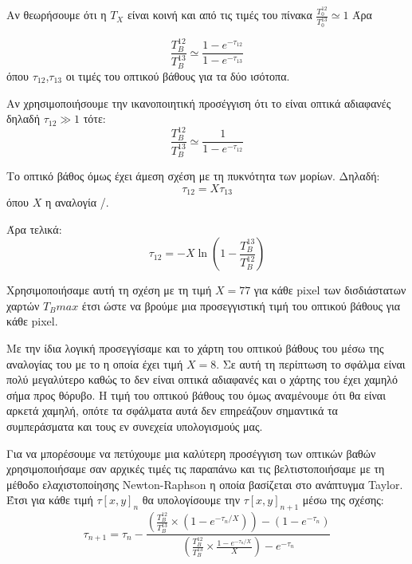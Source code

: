 \documentclass[a4paper,12pt]{memoir}
\begin{document}
Αν θεωρήσουμε ότι η $T_X$ είναι κοινή και από τις τιμές του πίνακα $\frac{T_0 ^{12}}{T_0 ^{13}} \simeq 1$
Άρα

\begin{equation}
\frac{T_B ^{12}}{T_B ^{13}} \simeq \frac{1-e^{-\tau _{12}}}{1-e^{-\tau _{13}}}
\end{equation}
όπου $\tau _{12}$,$\tau _{13}$ οι τιμές του οπτικού βάθους για τα δύο ισότοπα.

Αν χρησιμοποιήσουμε την ικανοποιητική προσέγγιση ότι το  είναι οπτικά αδιαφανές δηλαδή $\tau _{12} \gg 1$ τότε:
\begin{equation}
\frac{T_B ^{12}}{T_B ^{13}} \simeq \frac{1}{1-e^{-\tau _{12}}}
\end{equation}

Το οπτικό βάθος όμως έχει άμεση σχέση με τη πυκνότητα των μορίων. Δηλαδή:
\begin{equation}
\tau _{12} = X \tau _{13}
\end{equation}
όπου $X$ η αναλογία /.

Άρα τελικά:
\begin{equation}
\label{eq:od}
\tau _{12} = -X \ln \left( 1-\frac{T_B ^{13}}{T_B ^{12}} \right) 
\end{equation}

Χρησιμοποιήσαμε αυτή τη σχέση με τη τιμή $X=77$ \cite{schoier_2002} για κάθε pixel των δισδιάστατων χαρτών $T_Bmax$ έτσι ώστε να βρούμε μια προσεγγιστική τιμή του οπτικού βάθους για κάθε pixel. 

Με την ίδια λογική προσεγγίσαμε και το χάρτη του οπτικού βάθους του  μέσω της αναλογίας του με το  η οποία έχει τιμή $X=8$\cite{schoier_2002}. Σε αυτή τη περίπτωση το σφάλμα είναι πολύ μεγαλύτερο καθώς το  δεν είναι οπτικά αδιαφανές και ο χάρτης του  έχει χαμηλό σήμα προς θόρυβο. Η τιμή του οπτικού βάθους του  όμως αναμένουμε ότι θα είναι αρκετά χαμηλή, οπότε τα σφάλματα αυτά δεν επηρεάζουν σημαντικά τα συμπεράσματα και τους εν συνεχεία υπολογισμούς μας.

Για να μπορέσουμε να πετύχουμε μια καλύτερη προσέγγιση των οπτικών βαθών χρησιμοποιήσαμε σαν αρχικές τιμές τις παραπάνω και τις βελτιστοποιήσαμε με τη μέθοδο ελαχιστοποίησης Newton-Raphson η οποία βασίζεται στο ανάπτυγμα Taylor. Έτσι για κάθε τιμή $\tau[x,y] _n$ θα υπολογίσουμε την $\tau[x,y] _{n+1}$ μέσω της σχέσης:
\begin{equation}
\tau _{n+1} = \tau _n -\frac{\left( \frac{T_B ^{12}}{T_B ^{13}} \times (1-e^{-\tau _n/X}) \right)-(1-e^{-\tau _n} ) } {\left( \frac{T_B ^{12}}{T_B ^{13}} \times \frac{1-e^{-\tau _n /X}}{X} \right) -e^{-\tau _n}}
\end{equation}
\end{document}
